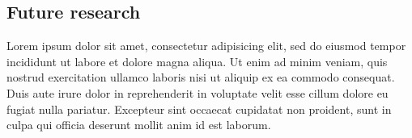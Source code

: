 \documentclass{sigchi}
\begin{document}
\subsection{Future research}

Lorem ipsum dolor sit amet, consectetur adipisicing elit, sed do eiusmod tempor incididunt ut labore et dolore magna aliqua. Ut enim ad minim veniam, quis nostrud exercitation ullamco laboris nisi ut aliquip ex ea commodo consequat. Duis aute irure dolor in reprehenderit in voluptate velit esse cillum dolore eu fugiat nulla pariatur. Excepteur sint occaecat cupidatat non proident, sunt in culpa qui officia deserunt mollit anim id est laborum.

\balance{}



\end{document}
